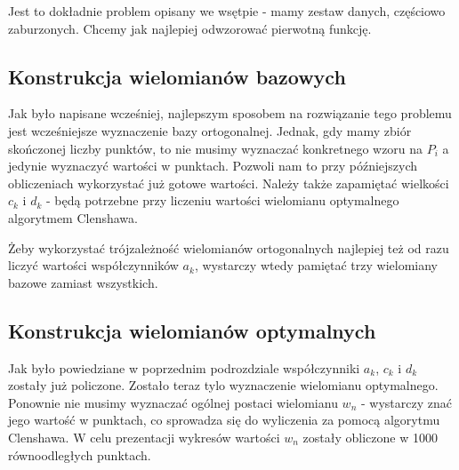 \documentclass[11pt]{article}
\begin{document}
Jest to dokładnie problem opisany we wsętpie - mamy zestaw danych, częściowo zaburzonych. Chcemy jak najlepiej odwzorować pierwotną funkcję.

\subsection{Konstrukcja wielomianów bazowych}
Jak było napisane wcześniej, najlepszym sposobem na rozwiązanie tego problemu jest wcześniejsze wyznaczenie bazy ortogonalnej. Jednak, gdy mamy zbiór skończonej liczby punktów, to nie musimy wyznaczać konkretnego wzoru na $P_i$ a jedynie wyznaczyć wartości w punktach. Pozwoli nam to przy późniejszych obliczeniach wykorzystać już gotowe wartości. Należy także zapamiętać wielkości $c_k$ i $d_k$ - będą potrzebne przy liczeniu wartości wielomianu optymalnego algorytmem Clenshawa.

Żeby wykorzystać trójzależność wielomianów ortogonalnych najlepiej też od razu liczyć wartości współczynników $a_k$, wystarczy wtedy pamiętać trzy wielomiany bazowe zamiast wszystkich.

\subsection{Konstrukcja wielomianów optymalnych}
Jak było powiedziane w poprzednim podrozdziale współczynniki $a_k$, $c_k$ i $d_k$ zostały już policzone. Zostało teraz tylo wyznaczenie wielomianu optymalnego. Ponownie nie musimy wyznaczać ogólnej postaci wielomianu $w_n$ - wystarczy znać jego wartość w punktach, co sprowadza się do wyliczenia za pomocą algorytmu Clenshawa.
W celu prezentacji wykresów wartości $w_n$ zostały obliczone w 1000 równoodległych punktach.
\end{document}

